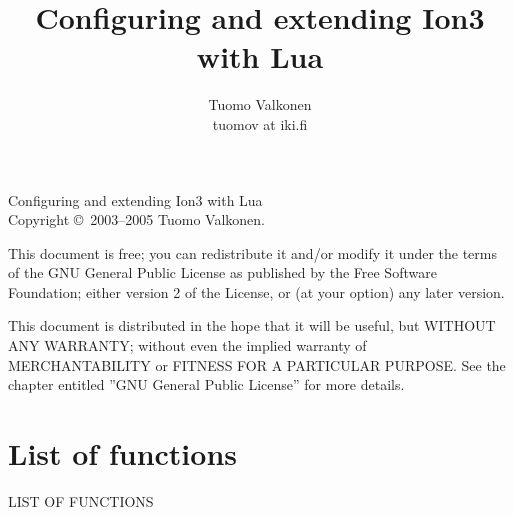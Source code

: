 \documentclass[english,a4paper,11pt,oldtoc,mctitle]{rapport3}
\title{Configuring and extending Ion3 with Lua}
\author{Tuomo Valkonen \\ tuomov at iki.fi}
\begin{document}
\maketitle

Configuring and extending Ion3 with Lua\\
Copyright \copyright\  2003--2005 Tuomo Valkonen.

This document is free; you can redistribute it and/or modify
it under the terms of the GNU General Public License as published by
the Free Software Foundation; either version 2 of the License, or
(at your option) any later version.

This document is distributed in the hope that it will be useful,
but WITHOUT ANY WARRANTY; without even the implied warranty of
MERCHANTABILITY or FITNESS FOR A PARTICULAR PURPOSE.  See the
chapter entitled ''GNU General Public License'' for more details.

\tableofcontents













\appendix





\chapter*{List of functions}
%
         {\MakeUppercase{List of functions}}%

\makeatletter
\def\fnlisti#1{\@dottedtocline{1}{0em}{1.5em}{\lstinline!#1!}{\pageref{fn:#1}}}
{\parskip\z@}
\makeatother

\begin{htmlonly}
\newcommand{\fnlisti}[1]{\fnref{#1}\\}

\end{htmlonly}

\printindex
\end{document}
